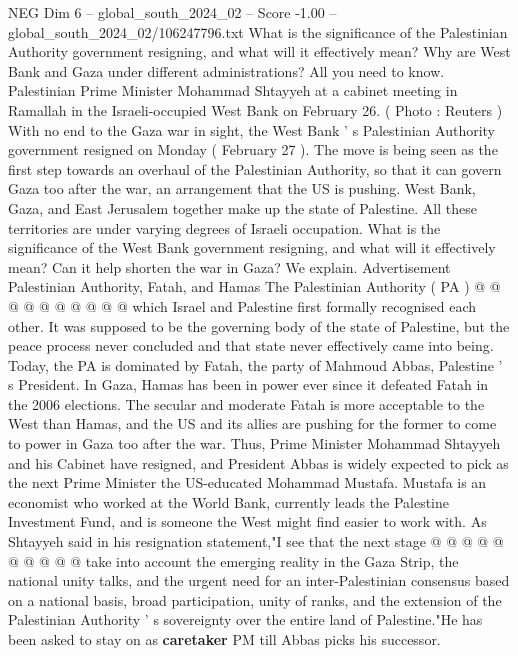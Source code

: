 \begin{textsample}{NEG Dim 6 – global\_south\_2024\_02 – Score -1.00 – global\_south\_2024\_02/106247796.txt}  \label{ex:f6_neg_267}
What is the significance of the Palestinian Authority government resigning, and what will it effectively mean?
Why are West Bank and Gaza under different administrations?
All you need to know.
Palestinian Prime Minister Mohammad Shtayyeh at a cabinet meeting in Ramallah in the Israeli-occupied West Bank on February 26. ( Photo : Reuters ) With no end to the Gaza war in sight, the West Bank ' s Palestinian Authority government resigned on Monday ( February 27 ).
The move is being seen as the first step towards an overhaul of the Palestinian Authority, so that it can govern Gaza too after the war, an arrangement that the US is pushing.
West Bank, Gaza, and East Jerusalem together make up the state of Palestine.
All these territories are under varying degrees of Israeli occupation.
What is the significance of the West Bank government resigning, and what will it effectively mean?
Can it help shorten the war in Gaza?
We explain.
Advertisement Palestinian Authority, Fatah, and Hamas The Palestinian Authority ( PA ) @ @ @ @ @ @ @ @ @ @ which Israel and Palestine first formally recognised each other.
It was supposed to be the governing body of the state of Palestine, but the peace process never concluded and that state never effectively came into being.
Today, the PA is dominated by Fatah, the party of Mahmoud Abbas, Palestine ' s President.
In Gaza, Hamas has been in power ever since it defeated Fatah in the 2006 elections.
The secular and moderate Fatah is more acceptable to the West than Hamas, and the US and its allies are pushing for the former to come to power in Gaza too after the war.
Thus, Prime Minister Mohammad Shtayyeh and his Cabinet have resigned, and President Abbas is widely expected to pick as the next Prime Minister the US-educated Mohammad Mustafa.
Mustafa is an economist who worked at the World Bank, currently leads the Palestine Investment Fund, and is someone the West might find easier to work with.
As Shtayyeh said in his resignation statement,"I see that the next stage @ @ @ @ @ @ @ @ @ @ take into account the emerging reality in the Gaza Strip, the national unity talks, and the urgent need for an inter-Palestinian consensus based on a national basis, broad participation, unity of ranks, and the extension of the Palestinian Authority ' s sovereignty over the entire land of Palestine."He has been asked to stay on as \textbf{caretaker} PM till Abbas picks his successor.

\end{textsample}

